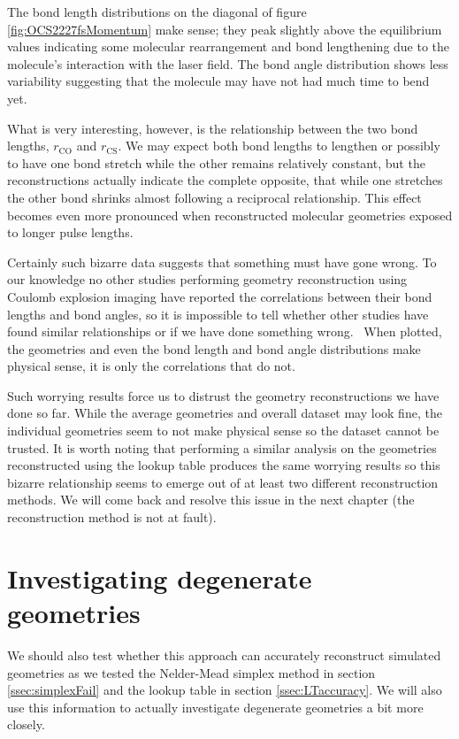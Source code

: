 The bond length distributions on the diagonal of figure \ref{fig:OCS2227fsMomentum} make sense; they peak slightly above the equilibrium values indicating some molecular rearrangement and bond lengthening due to the molecule's interaction with the laser field. The bond angle distribution shows less variability suggesting that the molecule may have not had much time to bend yet. %

What is very interesting, however, is the relationship between the two bond lengths, $r_\mathrm{CO}$ and $r_\mathrm{CS}$. We may expect both bond lengths to lengthen or possibly to have one bond stretch while the other remains relatively constant, but the reconstructions actually indicate the complete opposite, that while one stretches the other bond shrinks almost following a reciprocal relationship. This effect becomes even more pronounced when reconstructed molecular geometries exposed to longer pulse lengths.

Certainly such bizarre data suggests that something must have gone wrong. To our knowledge no other studies performing geometry reconstruction using Coulomb explosion imaging have reported the correlations between their bond lengths and bond angles, so it is impossible to tell whether other studies have found similar relationships or if we have done something wrong.\footnotemark~ When plotted, the geometries and even the bond length and bond angle distributions make physical sense, it is only the correlations that do not.


Such worrying results force us to distrust the geometry reconstructions we have done so far. While the average geometries and overall dataset may look fine, the individual geometries seem to not make physical sense so the dataset cannot be trusted. It is worth noting that performing a similar analysis on the geometries reconstructed using the lookup table produces the same worrying results so this bizarre relationship seems to emerge out of at least two different reconstruction methods. We will come back and resolve this issue in the next chapter (the reconstruction method is not at fault).

\section{Investigating degenerate geometries}
We should also test whether this approach can accurately reconstruct simulated geometries as we tested the Nelder-Mead simplex method in section \ref{ssec:simplexFail} and the lookup table in section \ref{ssec:LTaccuracy}. We will also use this information to actually investigate degenerate geometries a bit more closely.

